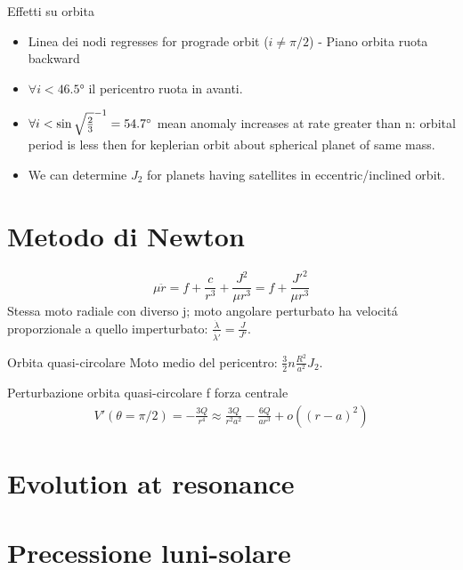 \begin{frame}{Effetti su orbita}
\begin{itemize}
\item Linea dei nodi regresses for prograde orbit ($i\neq\pi/2$) - Piano orbita ruota backward
\item $\forall i<\ang{46.5}$ il pericentro ruota in avanti.
\item $\forall i<\sin{\sqrt{\frac{2}{3}}}^{-1}=\ang{54.7}$ mean anomaly increases at rate greater than n: orbital period is less then for keplerian orbit about spherical planet of same mass.
\item We can determine $J_2$ for planets having satellites in eccentric/inclined orbit.
\end{itemize}
\end{frame}

\section{Metodo di Newton}
\begin{equation*}
\mu\ddot{r}=f+\frac{c}{r^3}+\frac{J^2}{\mu r^3}=f+\frac{J'^2}{\mu r^3}
\end{equation*}
Stessa moto radiale con diverso j; moto angolare perturbato ha velocit\'a proporzionale a quello imperturbato: $\frac{\dot{\lambda}}{\dot{\lambda'}}=\frac{J}{J'}$.
\begin{block}{Orbita quasi-circolare}
Moto medio del pericentro: $\frac{3}{2}n\frac{R^2}{a^2}J_2$.
\end{block}
\begin{wordonframe}{Perturbazione orbita quasi-circolare}
f forza centrale
\begin{align*}
V'(\theta=\pi/2)=-\frac{3Q}{r^4}\approx\frac{3Q}{r^2a^2}-\frac{6Q}{ar^3}+o((r-a)^2)
\end{align*}
\end{wordonframe}

\section{Evolution at resonance}

\section{Precessione luni-solare}

